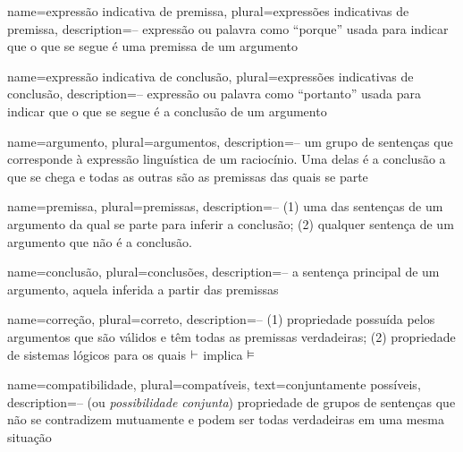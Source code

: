 

\makeglossaries



{
name=expressão indicativa de premissa,
plural=expressões indicativas de premissa,
description={-- expressão ou palavra como ``porque'' usada para indicar que o que se segue é uma premissa de um argumento}
}

{
name=expressão indicativa de conclusão,
plural=expressões indicativas de conclusão,
description={-- expressão ou palavra como ``portanto'' usada para indicar que o que se segue é a conclusão de um argumento}
}

{
name=argumento,
plural=argumentos,
description={-- um grupo de sentenças que corresponde à expressão linguística de um raciocínio. Uma delas é a conclusão a que se chega e todas as outras são as premissas das quais se parte}
}

{
name=premissa,
plural=premissas,
description={-- (1) uma das sentenças de um argumento da qual se parte para inferir a conclusão; (2) qualquer sentença de um argumento que não é a conclusão.}
}

{
name=conclusão,
plural=conclusões,
description={-- a sentença principal de um argumento, aquela inferida a partir das premissas}
}



{
name=correção,
plural=correto,
description={-- (1) propriedade possuída pelos argumentos que são válidos e têm todas as premissas verdadeiras; (2) propriedade de sistemas lógicos para os quais $\vdash$ implica $\vDash$}
}

{
name=compatibilidade,
plural=compatíveis,
text={conjuntamente possíveis}, %
description={-- (ou \textit{possibilidade conjunta}) propriedade de grupos de sentenças que não se contradizem mutuamente e podem ser todas verdadeiras em uma mesma situação}
}

